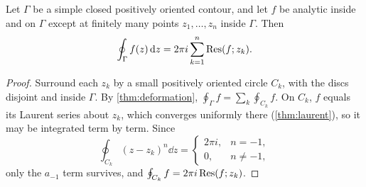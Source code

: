 \begin{theorem}\label{thm:residue-theorem}
  Let $\Gamma$ be a simple closed positively oriented contour, and let $f$ be
  analytic inside and on $\Gamma$ except at finitely many points
  $z_1, \dots, z_n$ inside $\Gamma$. Then
  \[
    \oint_\Gamma f(z) \mathop{}\!\mathrm{d} z = 2\pi i \sum_{k=1}^{n} \operatorname{Res}(f; z_k).
  \]
\end{theorem}

\begin{proof}
  Surround each $z_k$ by a small positively oriented circle $C_k$, with the
  discs disjoint and inside $\Gamma$. By \cref{thm:deformation},
  $\oint_\Gamma f = \sum_k \oint_{C_k} f$. On $C_k$, $f$ equals its Laurent
  series about $z_k$, which converges uniformly there (\cref{thm:laurent}),
  so it may be integrated term by term. Since
  \[
    \oint_{C_k} (z - z_k)^n \dd z =
    \begin{cases} 2\pi i, & n = -1, \\ 0, & n \neq -1, \end{cases}
  \]
  only the $a_{-1}$ term survives, and $\oint_{C_k} f = 2\pi i \operatorname{Res}(f; z_k)$.
\end{proof}
